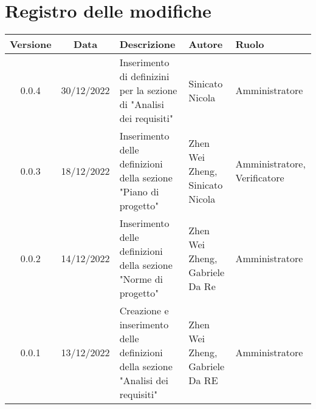 \section*{Registro delle modifiche}
\begin{center}
\renewcommand\tabularxcolumn[1]{>{\Centering}m{#1}}
\begin{tabularx}{\textwidth}{| c | c | X | X | X |} 
\hline
 \textbf{Versione} & \textbf{Data} & \textbf{Descrizione} & \textbf{Autore} & \textbf{Ruolo}\\
\hline
 0.0.4 & 30/12/2022 & Inserimento di definizini per la sezione di "Analisi dei requisiti" & Sinicato Nicola & Amministratore\\
 \hline
 0.0.3 & 18/12/2022 & Inserimento delle definizioni della sezione "Piano di progetto" & Zhen Wei Zheng, Sinicato Nicola & Amministratore, Verificatore\\
 \hline
 0.0.2 & 14/12/2022 & Inserimento delle definizioni della sezione "Norme di progetto" & Zhen Wei Zheng, Gabriele Da Re & Amministratore\\
 \hline
 0.0.1 & 13/12/2022 & Creazione e inserimento delle definizioni della sezione "Analisi dei requisiti" & Zhen Wei Zheng, Gabriele Da RE & Amministratore\\
 \hline
\end{tabularx}
\end{center}
